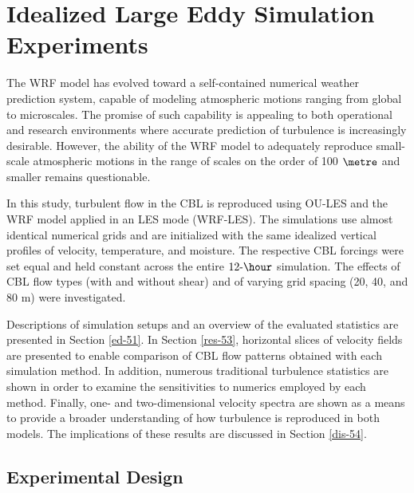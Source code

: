 \chapter{Idealized Large Eddy Simulation Experiments}
\label{les-5}

The WRF model has evolved toward a self-contained numerical weather prediction system, capable of modeling atmospheric motions ranging from global to microscales. The promise of such capability is appealing to both operational and research environments where accurate prediction of turbulence is increasingly desirable. However, the ability of the WRF model to adequately reproduce small-scale atmospheric motions in the range of scales on the order of 100 $\metre$  and smaller remains questionable.

In this study, turbulent flow in the CBL is reproduced using OU-LES and the WRF model applied in an LES mode (WRF-LES). The simulations use almost identical numerical grids and are initialized with the same idealized vertical profiles of velocity, temperature, and moisture. The respective CBL forcings were set equal and held constant across the entire $12\mbox{-}\hour$ simulation. The effects of CBL flow types (with and without shear) and of varying grid spacing (20, 40, and 80 m) were investigated.

Descriptions of simulation setups and an overview of the evaluated statistics are presented in Section \autoref{ed-51}. In Section \autoref{res-53}, horizontal slices of velocity fields are presented to enable comparison of CBL flow patterns obtained with each simulation method. In addition, numerous traditional turbulence statistics are shown in order to examine the sensitivities to numerics employed by each method. Finally, one- and two-dimensional velocity spectra are shown as a means to provide a broader understanding of how turbulence is reproduced in both models. The implications of these results are discussed in Section \autoref{dis-54}.

\section{Experimental Design}
\label{ed-51}

